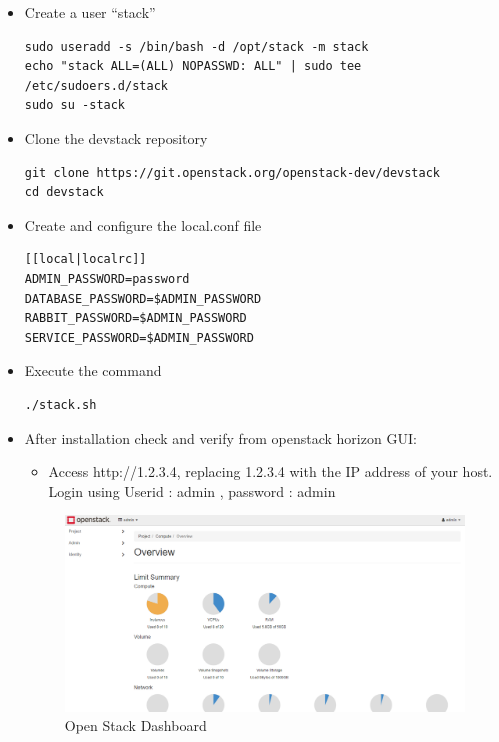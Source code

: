 \begin{itemize}
\item Create a user “stack”
\begin{lstlisting}
sudo useradd -s /bin/bash -d /opt/stack -m stack
echo "stack ALL=(ALL) NOPASSWD: ALL" | sudo tee /etc/sudoers.d/stack
sudo su -stack
\end{lstlisting}
\item Clone the devstack repository

\begin{lstlisting}
git clone https://git.openstack.org/openstack-dev/devstack
cd devstack
\end{lstlisting}

\item Create and configure the local.conf file
\begin{lstlisting}
[[local|localrc]]
ADMIN_PASSWORD=password
DATABASE_PASSWORD=$ADMIN_PASSWORD
RABBIT_PASSWORD=$ADMIN_PASSWORD
SERVICE_PASSWORD=$ADMIN_PASSWORD
\end{lstlisting}

\item Execute the command
\begin{lstlisting}
./stack.sh
\end{lstlisting}
\pagebreak
\item After installation check and verify from openstack horizon GUI:
\begin{itemize}
\item Access http://1.2.3.4, replacing 1.2.3.4 with the IP address of your host.
Login using Userid : admin , password : admin
\end{itemize}
\begin{figure} [H]
	\centering
	\includegraphics[width=0.5\linewidth]{figures/sh2}
	\caption{Open Stack Dashboard}
\end{figure}
\end{itemize}
